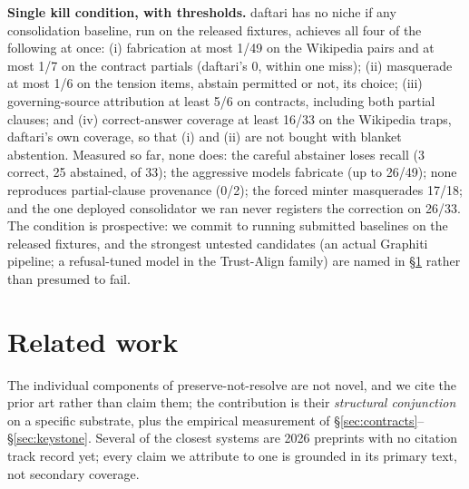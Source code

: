 \documentclass[11pt]{article}
\begin{document}
\textbf{Single kill condition, with thresholds.} daftari has no niche if any consolidation
baseline, run on the released fixtures, achieves all four of the following at once:
(i) fabrication at most 1/49 on the Wikipedia pairs and at most 1/7 on the contract
partials (daftari's 0, within one miss); (ii) masquerade at most 1/6 on the tension items,
abstain permitted or not, its choice; (iii) governing-source attribution at least 5/6 on
contracts, including both partial clauses; and (iv) correct-answer coverage at least 16/33
on the Wikipedia traps, daftari's own coverage, so that (i) and (ii) are not bought with
blanket abstention. Measured so far, none does: the careful abstainer loses recall (3
correct, 25 abstained, of 33); the aggressive models fabricate (up to 26/49); none
reproduces partial-clause provenance (0/2); the forced minter masquerades 17/18; and the
one deployed consolidator we ran never registers the correction on 26/33. The condition is
prospective: we commit to running submitted baselines on the released fixtures, and the
strongest untested candidates (an actual Graphiti pipeline; a refusal-tuned model in the
Trust-Align family) are named in \S\ref{sec:related} rather than presumed to fail.

\section{Related work}
\label{sec:related}

The individual components of preserve-not-resolve are not novel, and we cite the prior
art rather than claim them; the contribution is their \emph{structural conjunction} on a specific
substrate, plus the empirical measurement of \S\ref{sec:contracts}--\S\ref{sec:keystone}. Several of the closest systems are 2026
preprints with no citation track record yet; every claim we attribute to one is grounded in
its primary text, not secondary coverage.
\end{document}

